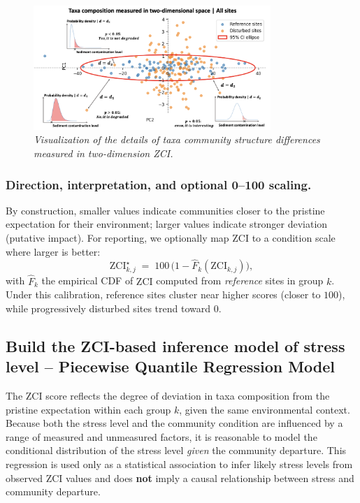 \begin{figure}[!h]
\centering
\includegraphics[width=0.8\textwidth]{../presentation/figures/p18_all_sites_in_2dimensional.png}
\caption{\textit{Visualization of the details of taxa community structure differences measured in two-dimension ZCI.}}
\label{fig:p18_all_sites_in_2dimensional}
\end{figure}

\subsubsection{Direction, interpretation, and optional 0--100 scaling.}

By construction, smaller values indicate communities closer to the pristine expectation for their environment; larger values indicate stronger deviation (putative impact).
For reporting, we optionally map ZCI to a condition scale where larger is better:
\[
\mathrm{ZCI}^{\star}_{k,j} \;=\; 100\,\big(1-\widehat{F}_k(\mathrm{ZCI}_{k,j})\big),
\]
with $\widehat{F}_k$ the empirical CDF of $\mathrm{ZCI}$ computed from \emph{reference} sites in group $k$. 
Under this calibration, reference sites cluster near higher scores (closer to $100$), while progressively disturbed sites trend toward $0$.

\subsection{Build the ZCI-based inference model of stress level – Piecewise Quantile Regression Model}

The $\mathrm{ZCI}$ score reflects the degree of deviation in taxa composition from the pristine expectation within each group $k$, given the same environmental context. 
Because both the stress level and the community condition are influenced by a range of measured and unmeasured factors, it is reasonable to model the conditional distribution of the stress level \emph{given} the community departure.  
This regression is used only as a statistical association to infer likely stress levels from observed $\mathrm{ZCI}$ values and does \textbf{not} imply a causal relationship between stress and community departure.

